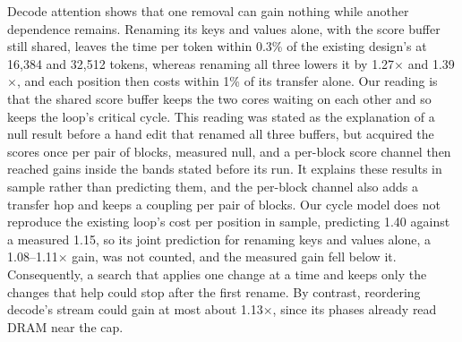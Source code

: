 Decode attention shows that one removal can gain nothing while another dependence remains.
Renaming its keys and values alone, with the score buffer still shared, leaves the time per token within 0.3\% of the existing design's at 16{,}384 and 32{,}512 tokens, whereas renaming all three lowers it by 1.27$\times$ and 1.39$\times$, and each position then costs within 1\% of its transfer alone.
Our reading is that the shared score buffer keeps the two cores waiting on each other and so keeps the loop's critical cycle.
This reading was stated as the explanation of a null result before a hand edit that renamed all three buffers, but acquired the scores once per pair of blocks, measured null, and a per-block score channel then reached gains inside the bands stated before its run.
It explains these results in sample rather than predicting them, and the per-block channel also adds a transfer hop and keeps a coupling per pair of blocks.
Our cycle model does not reproduce the existing loop's cost per position in sample, predicting 1.40 against a measured 1.15\us{}, so its joint prediction for renaming keys and values alone, a 1.08--1.11$\times$ gain, was not counted, and the measured gain fell below it.
Consequently, a search that applies one change at a time and keeps only the changes that help could stop after the first rename.
By contrast, reordering decode's stream could gain at most about 1.13$\times$, since its phases already read DRAM near the cap.

